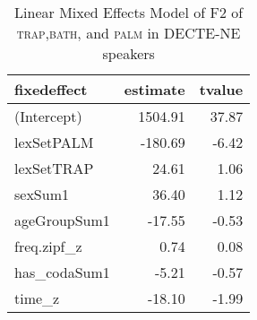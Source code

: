 \begin{table}[ht]
\centering
\begin{tabular}{lrr}
  \hline
fixedeffect & estimate & tvalue \\ 
  \hline
(Intercept) & 1504.91 & 37.87 \\ 
  lexSetPALM & -180.69 & -6.42 \\ 
  lexSetTRAP & 24.61 & 1.06 \\ 
  sexSum1 & 36.40 & 1.12 \\ 
  ageGroupSum1 & -17.55 & -0.53 \\ 
  freq.zipf\_z & 0.74 & 0.08 \\ 
  has\_codaSum1 & -5.21 & -0.57 \\ 
  time\_z & -18.10 & -1.99 \\ 
   \hline
\end{tabular}
\caption{Linear Mixed Effects Model of F2 of \textsc{trap},\textsc{bath}, and \textsc{palm} in DECTE-NE speakers \label{tbl:TBPF2DE}} 
\end{table}
